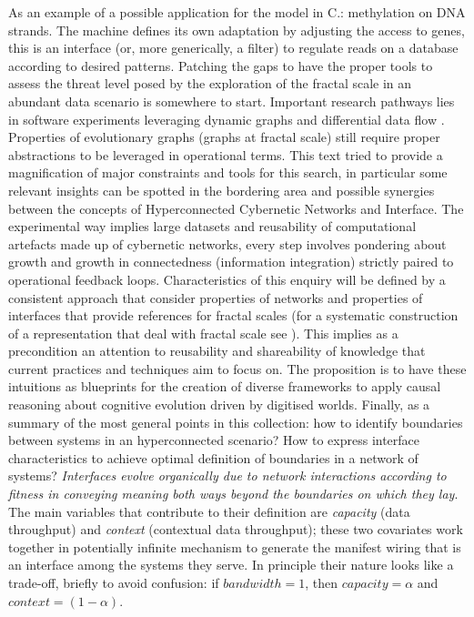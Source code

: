 \documentclass[14pt]{extarticle}
\begin{document}
As an example of a possible application for the model in C.: methylation on DNA strands. The machine defines its own adaptation by adjusting the access to genes, this is an interface (or, more generically, a filter) to regulate reads on a database according to desired patterns.
\newline
Patching the gaps to have the proper tools to assess the threat level posed by the exploration of the fractal scale in an abundant data scenario is somewhere to start. Important research pathways lies in software experiments leveraging dynamic graphs \cite{CS166dyngraphs} and differential data flow \cite{ABADIdiffdataflow}. Properties of evolutionary graphs (graphs at fractal scale) still require proper abstractions to be leveraged in operational terms. This text tried to provide a magnification of major constraints and tools for this search, in particular some relevant insights can be spotted in the bordering area and possible synergies between the concepts of Hyperconnected Cybernetic Networks and Interface. The experimental way implies large datasets and reusability of computational artefacts made up of cybernetic networks, every step involves pondering about growth and growth in connectedness (information integration) strictly paired to operational feedback loops. Characteristics of this enquiry will be defined by a consistent approach that consider properties of networks and properties of interfaces that provide references for fractal scales (for a systematic construction of a representation that deal with fractal scale see \cite{Wolfram2020}). This implies as a precondition an attention to reusability and shareability of knowledge that current practices and techniques aim to focus on. The proposition is to have these intuitions as blueprints for the creation of diverse frameworks to apply causal reasoning about cognitive evolution driven by digitised worlds.
\newline
\hspace*{15mm}Finally, as a summary of the most general points in this collection: how to identify boundaries between systems in an hyperconnected scenario? How to express interface characteristics to achieve optimal definition of boundaries in a network of systems? \textit{Interfaces evolve organically due to network interactions according to fitness in conveying meaning both ways beyond the boundaries on which they lay}. The main variables that contribute to their definition are \textit{capacity} (data throughput) and \textit{context} (contextual data throughput); these two covariates work together in potentially infinite mechanism to generate the manifest wiring that is an interface among the systems they serve. In principle their nature looks like a trade-off, briefly to avoid confusion: if \(bandwidth = 1\), then \(capacity = \alpha\) and \(context = (1 - \alpha)\).
\end{document}
